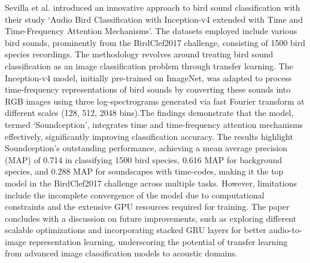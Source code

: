 Sevilla et al.\cite{sevilla2017audio} introduced an innovative approach to bird
sound classification with their study `Audio Bird Classification with
Inception-v4 extended with Time and Time-Frequency Attention Mechanisms'. The
datasets employed include various bird sounds, prominently from the
BirdClef2017 challenge, consisting of 1500 bird species recordings. The
methodology revolves around treating bird sound classification as an image
classification problem through transfer learning. The Inception-v4 model,
initially pre-trained on ImageNet, was adapted to process time-frequency
representations of bird sounds by converting these sounds into RGB images using
three log-spectrograms generated via fast Fourier transform at different scales
(128, 512, 2048 bins).The findings demonstrate that the model, termed
`Soundception', integrates time and time-frequency attention mechanisms
effectively, significantly improving classification accuracy. The results
highlight Soundception's outstanding performance, achieving a mean average
precision (MAP) of 0.714 in classifying 1500 bird species, 0.616 MAP for
background species, and 0.288 MAP for soundscapes with time-codes, making it
the top model in the BirdClef2017 challenge across multiple tasks. However,
limitations include the incomplete convergence of the model due to
computational constraints and the extensive GPU resources required for
training. The paper concludes with a discussion on future improvements, such as
exploring different scalable optimizations and incorporating stacked GRU layers
for better audio-to-image representation learning, underscoring the potential
of transfer learning from advanced image classification models to acoustic
domains.\\

